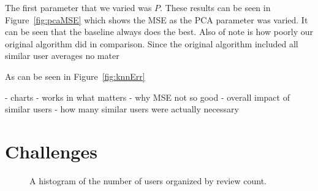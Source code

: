 \documentclass[10pt,twocolumn,letterpaper]{article}
\begin{document}
The first parameter that we varied was $P$. These results can be seen in Figure~\ref{fig:pcaMSE} which shows the MSE as the PCA parameter was varied. It can be seen that the baseline always does the best. Also of note is how poorly our original algorithm did in comparison. Since the original algorithm included all similar user averages no mater 

As can be seen in Figure~\ref{fig:knnErr}

- charts
- works in what matters
- why MSE not so good
- overall impact of similar users
- how many similar users were actually necessary


\section{Challenges}

\begin{figure}[t]
\begin{center}
\end{center}
   \caption{A histogram of the number of users organized by review count.}
\label{fig:usrCnt}
\end{figure}
\end{document}

